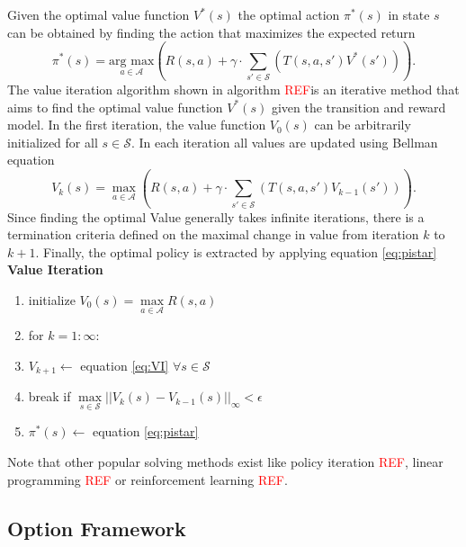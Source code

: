 Given the optimal value function $V^*(s)$ the optimal action $\pi^*(s)$ in state $s$ can be obtained by finding the action that maximizes the expected return
\begin{equation}\label{eq:pistar}
    \pi^*(s) = \underset{a\in\mathcal{A}}{\text{arg max}}\left(R(s,a) + \gamma\cdot \sum_{s'\in\mathcal{S}}\left(T(s,a,s')V^*(s')\right)\right).
\end{equation}
The value iteration algorithm shown in algorithm \textcolor{red}{REF}is an iterative method that aims to find the optimal value function $V^*(s)$ given the transition and reward model. In the first iteration, the value function $V_0(s)$ can be arbitrarily initialized for all $s\in\mathcal{S}$. In each iteration all values are updated using Bellman equation
\begin{equation}\label{eq:VI}
    V_{k}(s) = \underset{a\in\mathcal{A}}{\max}  \left(R(s,a) + \gamma\cdot \sum_{s'\in\mathcal{S}}\left(T(s,a,s')V_{k-1}(s')\right)\right).
\end{equation}
Since finding the optimal Value generally takes infinite iterations, there is a termination criteria defined on the maximal change in value from iteration $k$ to $k+1$. Finally, the optimal policy is extracted by applying equation \ref{eq:pistar}\\
\textbf{Value Iteration}
\begin{enumerate}
    \item initialize $V_0(s) = \underset{a\in\mathcal{A}}{\max}R(s,a)$
    \item for $k=1:\infty$:
    \item $V_{k+1} \leftarrow$ equation \ref{eq:VI} $\forall s\in\mathcal{S}$
    \item break if $\underset{s\in\mathcal{S}}{\max }||V_k(s)-V_{k-1}(s)||_\infty < \epsilon$
    \item $\pi^*(s) \leftarrow$ equation \ref{eq:pistar}
\end{enumerate}
Note that other popular solving methods exist like policy iteration \textcolor{red}{REF}, linear programming \textcolor{red}{REF} or reinforcement learning \textcolor{red}{REF}.
\subsection{Option Framework}\label{subsec:OPTIONS}
